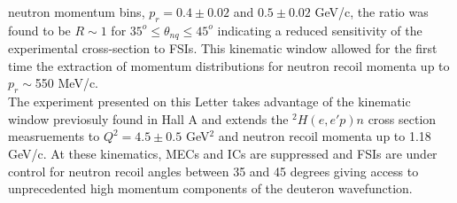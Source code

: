 neutron momentum bins, $p_{r}=0.4\pm0.02$ and $0.5\pm0.02$ GeV/c, the ratio was found to be $R\sim1$ for $35^{o}\leq \theta_{nq}\leq45^{o}$ indicating a reduced sensitivity of the experimental
cross-section to FSIs. This kinematic window allowed for the first time the extraction of momentum distributions for neutron recoil momenta up to $p_{r}\sim$550 MeV/c. \\
\indent The experiment presented on this Letter takes advantage of the kinematic window previosuly found in Hall A\cite{PhysRevLett.107.262501} and extends the $^{2}H(e,e'p)n$ cross section measruements
to $Q^{2}=4.5\pm0.5$ GeV$^{2}$ and neutron recoil momenta up to 1.18 GeV/c. At these kinematics, MECs and ICs are suppressed and FSIs are under control for neutron recoil angles between 35 and 45 degrees
giving access to unprecedented high momentum components of the deuteron wavefunction. \\
